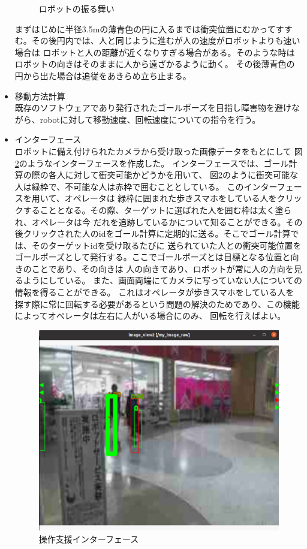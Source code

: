 \documentclass{kuisthesis}
\begin{document}
\begin{itemize}
\begin{figure}[H]
\begin{subfigure}{0.25\textwidth}
  \end{subfigure}
  \caption{ロボットの振る舞い}
  \label{pic:robot}
\end{figure}
まずはじめに半径3.5mの薄青色の円に入るまでは衝突位置にむかってすすむ。その後円内では、人と同じように進むが人の速度がロボットよりも速い場合は
ロボットと人の距離が近くなりすぎる場合がある。そのような時はロボットの向きはそのままに人から遠ざかるように動く。
その後薄青色の円から出た場合は追従をあきらめ立ち止まる。
  \item 移動方法計算 \\
  既存のソフトウェアであり発行されたゴールポーズを目指し障害物を避けながら、robotに対して移動速度、回転速度についての指令を行う。

  \item インターフェース \\
  ロボットに備え付けられたカメラから受け取った画像データをもとにして
  図\ref{pic:interface}のようなインターフェースを作成した。
  インターフェースでは、ゴール計算の際の各人に対して衝突可能かどうかを用いて、
  図\ref{pic:interface}のように衝突可能な人は緑枠で、不可能な人は赤枠で囲むこととしている。
  このインターフェースを用いて、オペレータは
  緑枠に囲まれた歩きスマホをしている人をクリックすることとなる。その際、ターゲットに選ばれた人を囲む枠は太く塗られ、オペレータは今
  だれを追跡しているかについて知ることができる。その後クリックされた人のidをゴール計算に定期的に送る。そこでゴール計算では、そのターゲットidを受け取るたびに
  送られていた人との衝突可能位置をゴールポーズとして発行する。ここでゴールポーズとは目標となる位置と向きのことであり、その向きは
  人の向きであり、ロボットが常に人の方向を見るようにしている。
  また、画面両端にてカメラに写っていない人についての情報を得ることができる。
  これはオペレータが歩きスマホをしている人を
  探す際に常に回転する必要があるという問題の解決のためであり、この機能によってオペレータは左右に人がいる場合にのみ、
  回転を行えばよい。
  \begin{figure}[htbp]
  
    \includegraphics[width=15cm]{img/interface.png}
    \caption{操作支援インターフェース}
    \label{pic:interface}
  \end{figure}
  

\end{itemize}
\end{document}

